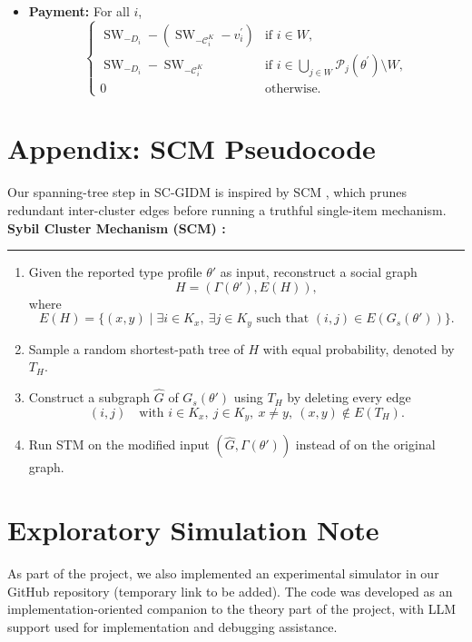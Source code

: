\documentclass[sigconf]{aamas}
\theoremstyle{definition}
\theoremstyle{remark}
\newcommand{\SW}{\operatorname{SW}}
\begin{document}
\begin{framed}
\begin{itemize}
\item \textbf{Payment:} For all $i$,
\[
\begin{cases}
\SW_{-D_i} - (\SW_{-\mathcal{C}_i^{K}} - v_i^\prime) & \text{if } i\in W,\\
\SW_{-D_i} - \SW_{-\mathcal{C}_i^{K}} & \text{if } i\in \bigcup_{j\in W}\mathcal{P}_j(\theta^\prime)\setminus W,\\
0 & \text{otherwise.}
\end{cases}
\]
\end{itemize}
\end{framed}

\section{Appendix: SCM Pseudocode}
\label{app:scm}
Our spanning-tree step in SC-GIDM is inspired by SCM \cite{ChenDWWZ23}, which prunes redundant inter-cluster edges before running a truthful single-item mechanism.\\
\noindent\textbf{Sybil Cluster Mechanism (SCM) :}\\
\rule{\linewidth}{0.5pt}
\begin{enumerate}[leftmargin=1.5em]
\item Given the reported type profile $\theta'$ as input, reconstruct a social graph
\[
H=(\Gamma(\theta'),E(H)),
\]
where
\[
E(H)=\{(x,y)\mid \exists i\in K_x,\ \exists j\in K_y \text{ such that } (i,j)\in E(G_s(\theta'))\}.
\]
\item Sample a random shortest-path tree of $H$ with equal probability, denoted by $T_H$.
\item Construct a subgraph $\widehat G$ of $G_s(\theta')$ using $T_H$ by deleting every edge
\[
(i,j)\quad \text{with } i\in K_x,\ j\in K_y,\ x\neq y,\ (x,y)\notin E(T_H).
\]
\item Run STM on the modified input $(\widehat G,\Gamma(\theta'))$ instead of on the original graph.
\end{enumerate}

\section{Exploratory Simulation Note}
\label{app:simulation}

As part of the project, we also implemented an experimental simulator in our GitHub repository (temporary link to be added). The code was developed as an implementation-oriented companion to the theory part of the project, with LLM support used for implementation and debugging assistance.
\end{document}
